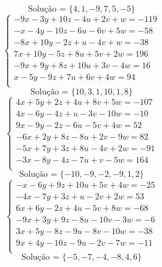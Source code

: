 \documentclass[12pt,oneside,a4paper]{article}
\begin{document}
\begin{equation*}
\text{Solução = }\{4,1,-9,7,5,-5\}
\end{equation*}
\vspace{\baselineskip}
\begin{equation*}
\begin{cases}
-9x-3y+10z-4u+2v+w=-119 \\
-x-4y-10z-6u-6v+5w=-58 \\
-8x+10y-2z+u-4v+w=-38 \\
7x+10y-5z+8u+5v+2w=196 \\
-9x+9y+8z+10u+3v-4w=16 \\
x-5y-9z+7u+6v+4w=94 \\
\end{cases}
\end{equation*}
\begin{equation*}
\text{Solução = }\{10,3,1,10,1,8\}
\end{equation*}
\vspace{\baselineskip}
\begin{equation*}
\begin{cases}
4x+5y+2z+4u+8v+5w=-107 \\
4x-6y-4z+u-3v-10w=-10 \\
9x-9y-2z-6u-5v+4w=52 \\
-6x+2y+8z-8u+2v-9w=82 \\
-5x+7y+3z+8u-4v+2w=-91 \\
-3x-8y-4z-7u+v-5w=164 \\
\end{cases}
\end{equation*}
\begin{equation*}
\text{Solução = }\{-10,-9,-2,-9,1,2\}
\end{equation*}
\vspace{\baselineskip}
\begin{equation*}
\begin{cases}
-x-6y+9z+10u+5v+4w=-25 \\
-4x-7y+3z+u-2v+2w=53 \\
6x+6y-2z+4u-5v+8w=-68 \\
-9x+3y+9z-8u-10v-3w=-6 \\
3x+5y-8z-9u-8v-10w=-38 \\
9x+4y-10z-9u-2v-7w=-11 \\
\end{cases}
\end{equation*}
\begin{equation*}
\text{Solução = }\{-5,-7,-4,-8,4,6\}
\end{equation*}
\end{document}
